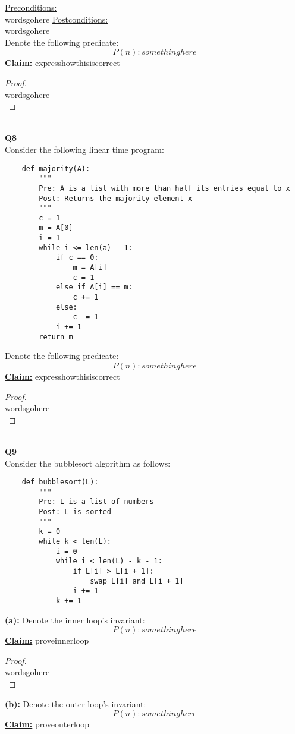 \documentclass[12pt]{article}
\begin{document}
\underline{Preconditions:} \\
wordsgohere
\underline{Postconditions:} \\
wordsgohere
\\
Denote the following predicate:
\[P(n): somethinghere\]
\textbf{\underline{Claim:}} expresshowthisiscorrect
\begin{proof}
\leavevmode\\
    wordsgohere \\
\end{proof}
\leavevmode\\
\textbf{Q8} \\
Consider the following linear time program:
\begin{lstlisting}
    def majority(A):
        """
        Pre: A is a list with more than half its entries equal to x
        Post: Returns the majority element x
        """
        c = 1
        m = A[0]
        i = 1
        while i <= len(a) - 1:
            if c == 0:
                m = A[i]
                c = 1
            else if A[i] == m:
                c += 1
            else:
                c -= 1
            i += 1
        return m
\end{lstlisting}
Denote the following predicate:
\[P(n): somethinghere\]
\textbf{\underline{Claim:}} expresshowthisiscorrect
\begin{proof}
\leavevmode\\
    wordsgohere \\
\end{proof}
\leavevmode\\
\textbf{Q9} \\
Consider the bubblesort algorithm as follows:
\begin{lstlisting}
    def bubblesort(L):
        """
        Pre: L is a list of numbers
        Post: L is sorted
        """
        k = 0
        while k < len(L):
            i = 0
            while i < len(L) - k - 1:
                if L[i] > L[i + 1]:
                    swap L[i] and L[i + 1]
                i += 1
            k += 1
\end{lstlisting}
\textbf{(a):} Denote the inner loop's invariant:
\[P(n): somethinghere\]
\textbf{\underline{Claim:}} proveinnerloop
\begin{proof}
\leavevmode\\
    wordsgohere \\
\end{proof}
\leavevmode
\textbf{(b):} Denote the outer loop's invariant:
\[P(n): somethinghere\]
\textbf{\underline{Claim:}} proveouterloop
\end{document}
